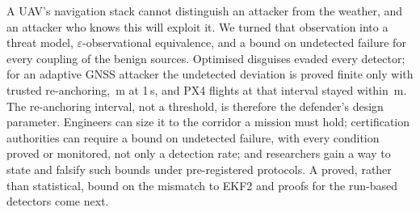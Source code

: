 A UAV's navigation stack cannot distinguish an attacker from the weather, and
an attacker who knows this will exploit it. We turned that observation into a
threat model, $\varepsilon$-observational equivalence, and a bound on undetected
failure for every coupling of the benign sources. Optimised disguises evaded
every detector; for an adaptive GNSS attacker the undetected deviation is
proved finite only with trusted re-anchoring, \nBoundTaOne\,m at 1\,s, and PX4
flights at that interval stayed within \nPxTaWorstDOneGate\,m. The re-anchoring interval, not a threshold,
is therefore the defender's design parameter. Engineers can size it to the
corridor a mission must hold; certification authorities can require a bound on
undetected failure, with every condition proved or monitored, not only a
detection rate; and researchers gain a way to state and falsify such
bounds under pre-registered protocols. A proved, rather than statistical, bound on
the mismatch to EKF2 and proofs for the run-based detectors come next.
